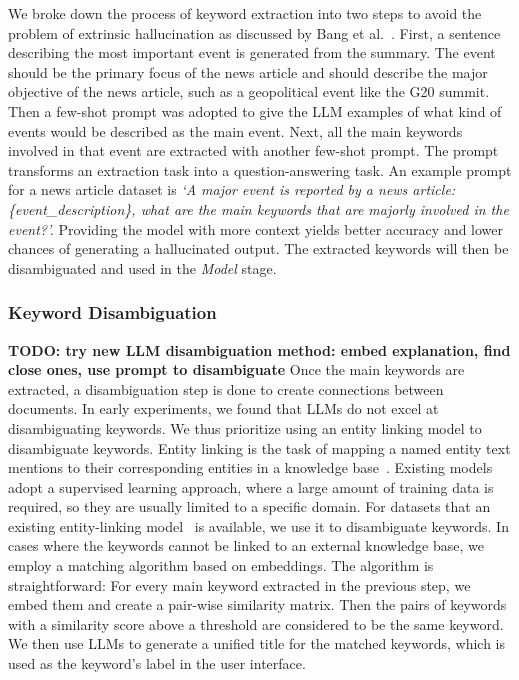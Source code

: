 We broke down the process of keyword extraction into two steps to avoid the problem of extrinsic hallucination as discussed by Bang et al.~\cite{bang2023multitask}.
First, a sentence describing the most important event is generated from the summary. 
The event should be the primary focus of the news article and should describe the major objective of the news article, such as a geopolitical event like the G20 summit.
Then a few-shot prompt was adopted to give the LLM examples of what kind of events would be described as the main event. 
Next, all the main keywords involved in that event are extracted with another few-shot prompt.
The prompt transforms an extraction task into a question-answering task.
An example prompt for a news article dataset is 
\textit{`A major event is reported by a news article: \{event\_description\}, what are the main keywords that are majorly involved in the event?'.}
Providing the model with more context yields better accuracy and lower chances of generating a hallucinated output.
The extracted keywords will then be disambiguated and used in the \textit{Model} stage.

\subsubsection{Keyword Disambiguation}\label{sec: keyword_disambiguation}
\textbf{TODO: try new LLM disambiguation method: embed explanation, find close ones, use prompt to disambiguate}
Once the main keywords are extracted, a disambiguation step is done to create connections between documents.
In early experiments, we found that LLMs do not excel at disambiguating keywords.
We thus prioritize using an entity linking model to disambiguate keywords.
Entity linking is the task of mapping a named entity text mentions to their corresponding entities in a knowledge base~\cite{shen2014entity}.
Existing models adopt a supervised learning approach, where a large amount of training data is required, so they are usually limited to a specific domain.
For datasets that an existing entity-linking model~\cite{ayoola2022refined} is available, we use it to disambiguate keywords.
In cases where the keywords cannot be linked to an external knowledge base, we employ a matching algorithm based on embeddings.
The algorithm is straightforward:
For every main keyword extracted in the previous step, we embed them and create a pair-wise similarity matrix.
Then the pairs of keywords with a similarity score above a threshold are considered to be the same keyword.
We then use LLMs to generate a unified title for the matched keywords, which is used as the keyword's label in the user interface.

